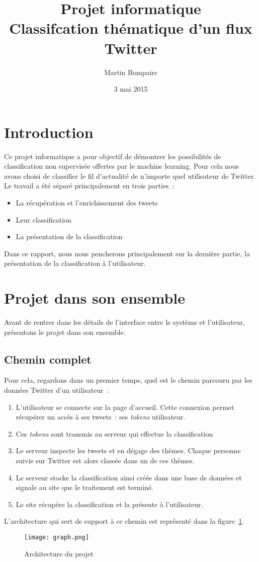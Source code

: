 \documentclass[a4paper]{article}
\title{Projet informatique\\Classifcation thématique d'un flux Twitter}
\author{Martin Bompaire}
\date{3 mai 2015}
\begin{document}
\maketitle

\section{Introduction}
Ce projet informatique a pour objectif de démontrer les possibilités de classification non supervisée offertes par le machine learning. Pour cela nous avons choisi de classifier le fil d'actualité de n'importe quel utilisateur de Twitter. Le travail a été séparé principalement en trois parties~: 
\begin{itemize}
\item La récupération et l'enrichissement des tweets
\item Leur classification
\item La présentation de la classification
\end{itemize}
Dans ce rapport, nous nous pencherons principalement sur la dernière partie, la présentation de la classification à l'utilisateur.

\section{Projet dans son ensemble}
Avant de rentrer dans les détails de l'interface entre le système et l'utilisateur, présentons le projet dans son ensemble. 

\subsection{Chemin complet}
Pour cela, regardons dans un premier temps, quel est le chemin parcouru par les données Twitter d'un utilisateur~:
\begin{enumerate}
\item L'utilisateur se connecte sur la page d'accueil. Cette connexion permet récupérer un accès à ses tweets~: ses \emph{tokens} utilisateur.
\item Ces \emph{tokens} sont transmis au serveur qui effectue la classification
\item Le serveur inspecte les tweets et en dégage des thèmes. Chaque personne suivie sur Twitter est alors classée dans un de ces thèmes.
\item Le serveur stocke la classification ainsi créée dans une base de données et signale au site que le traitement est terminé.
\item Le site récupère la classification et la présente à l'utilisateur.
\end{enumerate}
L'architecture qui sert de support à ce chemin est représenté dans la figure~\ref{fig:graph}.
\begin{figure}
\begin{center}
\texttt{[image: graph.png]}
\caption{Architecture du projet}
\label{fig:graph}
\end{center}
\end{figure}
\end{document}
